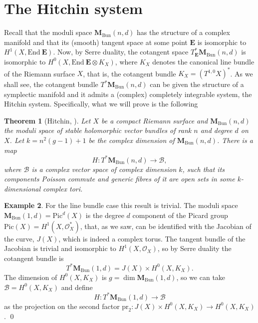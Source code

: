 \documentclass[12pt,a4paper]{book}
\newtheorem{thm}{Theorem}[section]
\theoremstyle{definition} \newtheorem{defn}[thm]{Definition}
\theoremstyle{definition} \newtheorem{ejemplo}[thm]{Example}
\theoremstyle{remark} \newtheorem{rem}[thm]{Remark}
\def\pr{\mathrm{pr}}
\def\OO{\mathscr{O}}
\def\BB{\mathscr{B}}
\def\End{\mathrm{End}}
\def\Bun{\mathbf{M}_{\mathrm{Bun}}}
\def\Pic{\mathrm{Pic}}
\newcommand{\ve}[1]{\mathbf{#1}}
\begin{document}
\section{The Hitchin system}
Recall that the moduli space $\Bun(n,d)$ has the structure of a complex manifold and that its (smooth) tangent space at some point $\ve{E}$ is isomorphic to $H^1(X,\End\ \ve{E})$. Now, by Serre duality, the cotangent space $T_{\ve{E}}^*\Bun(n,d)$ is isomorphic to $H^0(X,\End\ \ve{E} \otimes K_X)$, where $K_X$ denotes the canonical line bundle of the Riemann surface $X$, that is, the cotangent bundle $K_X=(T^{1,0}X)^*$. As we shall see, the cotangent bundle $T^*\Bun(n,d)$ can be given the structure of a symplectic manifold and it admits a (complex) completely integrable system, the Hitchin system. Specifically, what we will prove is the following
\begin{thm}[Hitchin, \cite{hitchinsystem}] \label{hitchinsystem}
  Let $X$ be a compact Riemann surface and $\Bun(n,d)$ the moduli space of stable holomorphic vector bundles of rank $n$ and degree $d$ on $X$. Let $k=n^2(g-1)+1$ be the complex dimension of $\Bun(n,d)$. There is a map
  \begin{equation*}
    H: T^*\Bun(n,d) \rightarrow \BB,
  \end{equation*}
  where $\BB$ is a complex vector space of complex dimension $k$, such that its components Poisson commute and generic fibres of it are open sets in some $k$-dimensional complex tori.
\end{thm}

\begin{ejemplo}
  For the line bundle case this result is trivial. The moduli space $\Bun(1,d)=\Pic^d(X)$ is the degree $d$ component of the Picard group $\Pic(X)=H^1(X,\OO_X^*)$, that, as we saw, can be identified with the Jacobian of the curve, $J(X)$, which is indeed a complex torus. The tangent bundle of the Jacobian is trivial and isomorphic to $H^1(X,\OO_X)$, so by Serre duality the cotangent bundle is 
  \begin{equation*}
    T^*\Bun(1,d) = J(X)\times H^0(X,K_X).
  \end{equation*}
  The dimension of $H^0(X,K_X)$ is $g=\dim \Bun(1,d)$, so we can take $\BB=H^0(X,K_X)$ and define
  \begin{equation*}
    H:T^*\Bun(1,d) \rightarrow \BB
  \end{equation*}
  as the projection on the second factor $\pr_2:J(X)\times H^0(X,K_X) \rightarrow H^0(X,K_X)$. \qed
\end{ejemplo}
  
\end{document}

